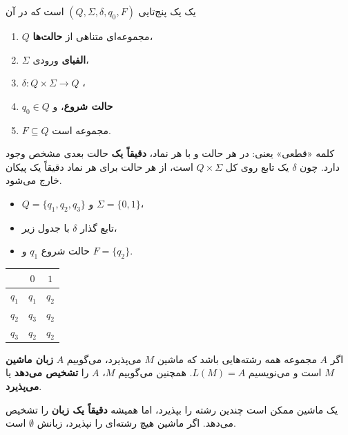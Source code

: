 \begin{definition}
یک  یک پنج‌تایی $(Q,\Sigma,\delta,q_0,F)$ است که در آن
\begin{enumerate}
\item $Q$ مجموعه‌ای متناهی از \textbf{حالت‌ها}،
\item $\Sigma$ \textbf{الفبای} ورودی،
\item $\delta:Q\times\Sigma\to Q$ ،
\item $q_0\in Q$ \textbf{حالت شروع}، و
\item $F\subseteq Q$ مجموعه  است.
\end{enumerate}
\end{definition}

کلمه «قطعی» یعنی: در هر حالت و با هر نماد، \textbf{دقیقاً یک} حالت بعدی مشخص وجود دارد. چون $\delta$ یک تابع روی کل $Q\times\Sigma$ است، از هر حالت برای هر نماد دقیقاً یک پیکان خارج می‌شود.

\begin{example}
\begin{itemize}
\item $Q=\{q_1,q_2,q_3\}$ و $\Sigma=\{0,1\}$،
\item تابع گذار $\delta$ با جدول زیر،
\item حالت شروع $q_1$ و $F=\{q_2\}$.
\end{itemize}
\begin{ltrfig}
\begin{tabular}{c|cc}
 & $0$ & $1$\\ \hline
$q_1$ & $q_1$ & $q_2$\\
$q_2$ & $q_3$ & $q_2$\\
$q_3$ & $q_2$ & $q_2$
\end{tabular}
\end{ltrfig}
\end{example}

\begin{definition}
اگر $A$ مجموعه همه رشته‌هایی باشد که ماشین $M$ می‌پذیرد، می‌گوییم $A$ \textbf{زبان ماشین} $M$ است و می‌نویسیم $L(M)=A$. همچنین می‌گوییم $M$، $A$ را \textbf{تشخیص می‌دهد} یا \textbf{می‌پذیرد}.
\end{definition}

\begin{note}
یک ماشین ممکن است چندین رشته را بپذیرد، اما همیشه \textbf{دقیقاً یک زبان} را تشخیص می‌دهد. اگر ماشین هیچ رشته‌ای را نپذیرد، زبانش $\emptyset$ است.
\end{note}

